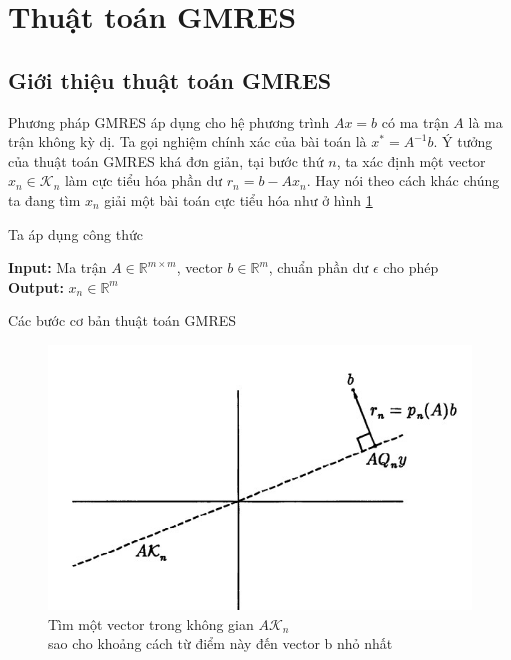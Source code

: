 \documentclass[14pt, a4paper]{article}
\numberwithin{equation}{section}
\numberwithin{algorithm}{section}
\numberwithin{figure}{section}
\numberwithin{dl}{section}
\numberwithin{md}{section}
\numberwithin{bd}{section}
\numberwithin{dn}{section}
\begin{document}
\section{Thuật toán GMRES}

\subsection{Giới thiệu thuật toán GMRES} \label{GMRES-Introduction}

Phương pháp GMRES áp dụng cho hệ phương trình $Ax=b$ có ma trận $A$ là ma trận không kỳ dị. Ta gọi nghiệm chính xác của bài toán là $x^* = A^{-1}b$. Ý tưởng của thuật toán GMRES khá đơn giản, tại bước thứ $n$, ta xác định một vector $x_n \in \mathcal{K}_n$ làm cực tiểu hóa phần dư $r_n = b - A x_n$. Hay nói theo cách khác chúng ta đang tìm $x_n$ giải một bài toán cực tiểu hóa như ở hình \ref{fig:GMRES-LS}



Ta áp dụng công thức
\begin{algorithm}[h!]
    \hspace*{\algorithmicindent} \textbf{Input:} {Ma trận $A \in \mathbb{R}^{m \times m}$, vector $b \in \mathbb{R}^m$, chuẩn phần dư $\epsilon$ cho phép} \\
    \hspace*{\algorithmicindent} \textbf{Output:} {$x_n \in \mathbb{R}^m$}
    \caption{Các bước cơ bản thuật toán GMRES}\label{alg:GMRES}
    \begin{algorithmic}
        \EndFor
    \end{algorithmic}
\end{algorithm}

\begin{figure}[h!] \centering

    \includegraphics[scale=0.8]{GMRES-LS.jpg}
    \caption{Tìm một vector trong không gian $A \mathcal{K}_n$ \\ sao cho khoảng cách từ điểm này đến vector b nhỏ nhất}

    \label{fig:GMRES-LS}
\end{figure}
\end{document}
